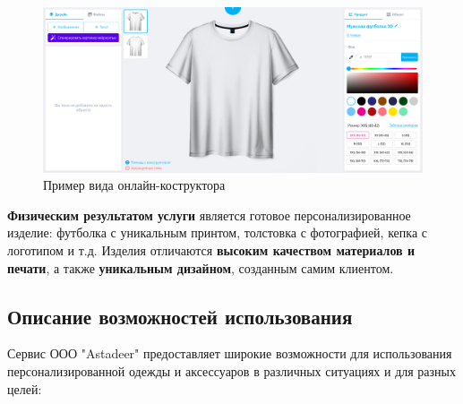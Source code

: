 \begin{figure}
    \centering
    \includegraphics[width=\textwidth]{img/editor.png}
    \caption{Пример вида онлайн-коструктора}
    \label{fig:editor}
\end{figure}

\vspace{0.3cm}

\textbf{Физическим результатом услуги} является готовое персонализированное изделие: футболка с уникальным принтом, толстовка с фотографией, кепка с логотипом и т.д.  Изделия отличаются \textbf{высоким качеством материалов и печати}, а также \textbf{уникальным дизайном}, созданным самим клиентом.

\subsection{Описание возможностей использования}

Сервис ООО "Astadeer" предоставляет широкие возможности для использования персонализированной одежды и аксессуаров в различных ситуациях и для разных целей:

